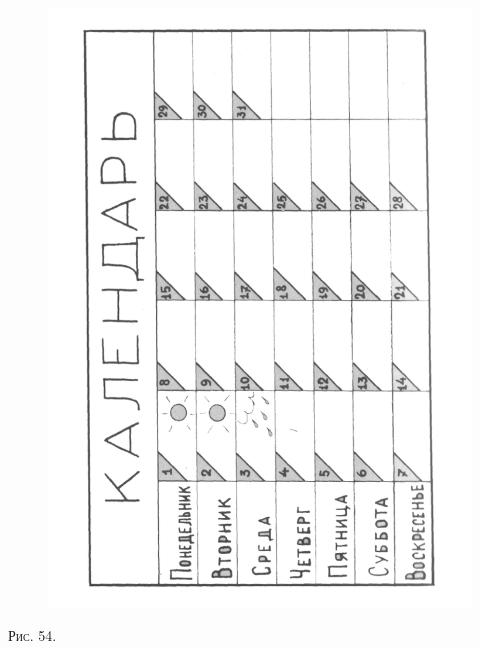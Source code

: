 \documentclass[a5paper]{book}
\begin{document}
\begin{figure}
\centering
\includegraphics[width=\linewidth]{media/media/image50.png}
\end{figure}

\textsc{Рис.} 54.
\end{document}
